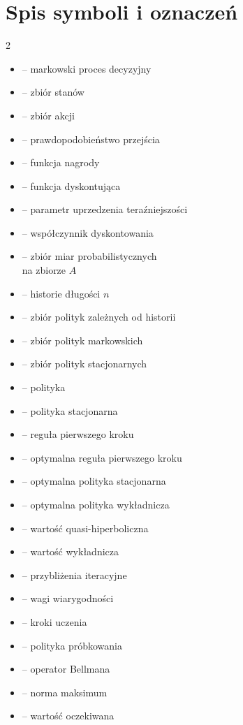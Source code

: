 \documentclass[inzynierska]{pwr_wmat_praca_dyplomowa}
\theoremstyle{tightplain}
\begin{document}
\frontmatter
\maketitle
\tableofcontents

\chapter*{Spis symboli i oznaczeń}
\begin{multicols}{2}
\raggedleft
\begin{itemize}
    \item[$M$] -- markowski proces decyzyjny
    \item[$S$] -- zbiór stanów
    \item[$A$] -- zbiór akcji
    \item[$q$] -- prawdopodobieństwo przejścia
    \item[$r$] -- funkcja nagrody
    \item[$d(t)$] -- funkcja dyskontująca
    \item[$\alpha$] -- parametr uprzedzenia teraźniejszości
    \item[$\beta$] -- współczynnik dyskontowania
    \item[$\Pr(A)$] -- zbiór miar probabilistycznych \\ na zbiorze $A$ 
    \item[$\mathcal{H}_n$] -- historie długości $n$
    \item[$\Phi$] -- zbiór polityk zależnych od historii
    \item[$\Phi_m$] -- zbiór polityk markowskich
    \item[$\Phi_s$] -- zbiór polityk stacjonarnych
    \item[$\phi$] -- polityka
    \item[$\phi_s$] -- polityka stacjonarna
    \item[$\mu$] -- reguła pierwszego kroku
    \item[$\mu^\star$] -- optymalna reguła pierwszego kroku
    \item[$\phi_s^\star$] -- optymalna polityka stacjonarna
    \item[$\phi_\beta^\star$] -- optymalna polityka wykładnicza
    \item[$J_{\phi}^{\alpha,\beta}$] -- wartość quasi-hiperboliczna
    \item[$J_{\phi}^{\beta}$] -- wartość wykładnicza
    \item[$J_n$, $W_n$, $Q_n$] -- przybliżenia iteracyjne
    \item[$\rho_n^J$, $\rho_n^W$] -- wagi wiarygodności
    \item[$\eta_n$, $\theta_n$] -- kroki uczenia
    \item[$\nu$] -- polityka próbkowania
    \item[$T^{\phi_s}$] -- operator Bellmana
    \item[$\|\cdot\|_\infty$] -- norma maksimum
    \item[$\mathbb{E}$] -- wartość oczekiwana


\end{itemize}
\end{multicols}
\end{document}
